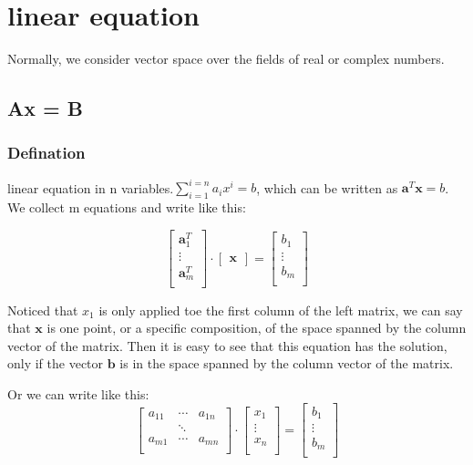 \documentclass[UTF8]{../../09-Mathematics}
\begin{document}
\section{linear equation}

Normally, we consider vector space over the fields of real or complex numbers.

\subsection{Ax = B}

\subsubsection{Defination}

linear equation in n variables.$\sum_{i = 1}^{i=n}a_ix^i = b$, which can be written as $\boldsymbol a^T \boldsymbol x = b$. We collect m equations and write like this:

\begin{equation}
  \begin{bmatrix}
    \boldsymbol a^T_1 \\
    \vdots \\
    \boldsymbol a^T_m \\
  \end{bmatrix}
  \cdot
  \begin{bmatrix}
    \boldsymbol x
  \end{bmatrix}
  =
  \begin{bmatrix}
     b_1 \\
    \vdots \\
     b_m \\
  \end{bmatrix}
\end{equation}

Noticed that $x_1$ is only applied toe the first column of the left matrix, we can say that $ \boldsymbol x$ is one point, or a specific composition, of the space spanned by the column vector of the matrix. Then it is easy to see that this equation has the solution, only if the vector $ \boldsymbol b$ is in the space spanned by the column vector of the matrix.


Or we can write like this:
\begin{equation}
  \begin{bmatrix}
     a_{11} & \cdots & a_{1n}\\
     & \ddots & \\
     a_{m1} & \cdots & a_{mn} \\
  \end{bmatrix}
  \cdot
  \begin{bmatrix}
    x_1 \\
    \vdots \\
    x_n \\
  \end{bmatrix}
  =
  \begin{bmatrix}
    b_1 \\
    \vdots \\
    b_m \\
  \end{bmatrix}
\end{equation}
\end{document}
